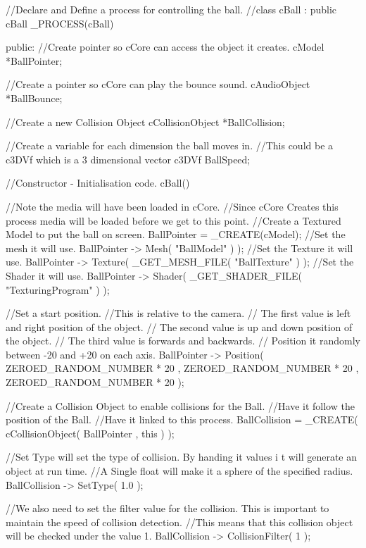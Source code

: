 \begin{DoxyCode}
//Declare and Define a process for controlling the ball.
//class cBall : public cBall
 _PROCESS(cBall)
 {
 public:
 //Create pointer so cCore can  access the object it creates.
 cModel *BallPointer;

 //Create a pointer so cCore can play the bounce sound.
 cAudioObject *BallBounce;

 //Create a new Collision Object
 cCollisionObject *BallCollision;

 //Create a variable for each dimension the ball moves in.
 //This could be a c3DVf which is a 3 dimensional vector
 c3DVf BallSpeed;

  //Constructor - Initialisation code.
        cBall()
        {
                //Note the media will have been loaded in cCore.
                //Since cCore Creates this process media will be loaded before we
       get to this point.
                //Create a Textured Model to put the ball on screen.
        BallPointer =  _CREATE(cModel);
                //Set the mesh it will use.
        BallPointer -> Mesh( "BallModel" ) );
                //Set the Texture it will use.
        BallPointer -> Texture( _GET_MESH_FILE( "BallTexture" ) );
                //Set the Shader it will use.
        BallPointer -> Shader( _GET_SHADER_FILE( "TexturingProgram" ) );

                //Set a start position.
                //This is relative to the camera.
                // The first value is left and right position of the object.
                // The second value is up and down position of the object.
                // The third value is forwards and backwards.
                // Position it randomly between -20 and +20 on each axis.
        BallPointer -> Position( ZEROED_RANDOM_NUMBER * 20 , ZEROED_RANDOM_NUMBER
       * 20 , ZEROED_RANDOM_NUMBER * 20 );

                //Create a Collision Object to enable collisions for the Ball.
                //Have it follow the position of the Ball.
                //Have it linked to this process.
        BallCollision = _CREATE( cCollisionObject( BallPointer , this ) );

                //Set Type will set the type of collision. By handing it values i
      t will generate an object at run time.
                //A Single float will make it a sphere of the specified radius.
        BallCollision -> SetType( 1.0 );

                //We also need to set the filter value for the collision. This is
       important to maintain the speed of collision detection.
                //This means that this collision object will be checked under the
       value 1.
        BallCollision -> CollisionFilter( 1 );

}}
\end{DoxyCode}
